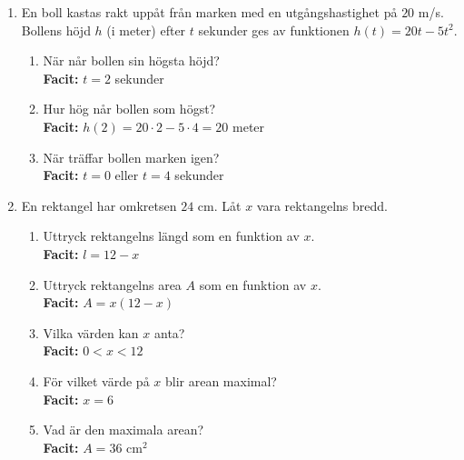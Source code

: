 \documentclass[a4paper,11pt]{article}
\begin{document}
\begin{enumerate}[label=\textbf{\arabic*.}]
    \item En boll kastas rakt uppåt från marken med en utgångshastighet på $20$ m/s. Bollens höjd $h$ (i meter) efter $t$ sekunder ges av funktionen $h(t) = 20t - 5t^2$. 
    \begin{enumerate}[label=\alph*)]
        \item När når bollen sin högsta höjd?
        \\ \textbf{Facit:} $t=2$ sekunder
        \item Hur hög når bollen som högst?
        \\ \textbf{Facit:} $h(2) = 20\cdot2 - 5\cdot4 = 20$ meter
        \item När träffar bollen marken igen?
        \\ \textbf{Facit:} $t=0$ eller $t=4$ sekunder
    \end{enumerate}
    
    \item En rektangel har omkretsen $24$ cm. Låt $x$ vara rektangelns bredd.
    \begin{enumerate}[label=\alph*)]
        \item Uttryck rektangelns längd som en funktion av $x$.
        \\ \textbf{Facit:} $l = 12-x$
        \item Uttryck rektangelns area $A$ som en funktion av $x$.
        \\ \textbf{Facit:} $A = x(12-x)$
        \item Vilka värden kan $x$ anta?
        \\ \textbf{Facit:} $0 < x < 12$
        \item För vilket värde på $x$ blir arean maximal?
        \\ \textbf{Facit:} $x=6$
        \item Vad är den maximala arean?
        \\ \textbf{Facit:} $A=36$ cm$^2$
    \end{enumerate}
\end{enumerate}
\end{document}
